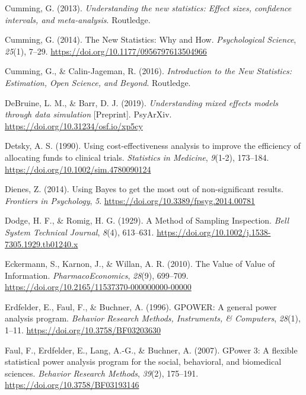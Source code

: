 \documentclass[
  english,
  ,jou, a4paper,floatsintext]{apa6}
\newlength{\cslhangindent}
\newenvironment{cslreferences}%
  {\setlength{\parindent}{0pt}%
  \everypar{\setlength{\hangindent}{\cslhangindent}}\ignorespaces}%
  {\par}
\begin{document}
\begin{cslreferences}
\leavevmode\hypertarget{ref-cumming_understanding_2013}{}%
Cumming, G. (2013). \emph{Understanding the new statistics: Effect sizes, confidence intervals, and meta-analysis}. Routledge.

\leavevmode\hypertarget{ref-cumming_new_2014}{}%
Cumming, G. (2014). The New Statistics: Why and How. \emph{Psychological Science}, \emph{25}(1), 7--29. \url{https://doi.org/10.1177/0956797613504966}

\leavevmode\hypertarget{ref-cumming_introduction_2016}{}%
Cumming, G., \& Calin-Jageman, R. (2016). \emph{Introduction to the New Statistics: Estimation, Open Science, and Beyond}. Routledge.

\leavevmode\hypertarget{ref-debruine_understanding_2019}{}%
DeBruine, L. M., \& Barr, D. J. (2019). \emph{Understanding mixed effects models through data simulation} {[}Preprint{]}. PsyArXiv. \url{https://doi.org/10.31234/osf.io/xp5cy}

\leavevmode\hypertarget{ref-detsky_using_1990}{}%
Detsky, A. S. (1990). Using cost-effectiveness analysis to improve the efficiency of allocating funds to clinical trials. \emph{Statistics in Medicine}, \emph{9}(1-2), 173--184. \url{https://doi.org/10.1002/sim.4780090124}

\leavevmode\hypertarget{ref-dienes_using_2014}{}%
Dienes, Z. (2014). Using Bayes to get the most out of non-significant results. \emph{Frontiers in Psychology}, \emph{5}. \url{https://doi.org/10.3389/fpsyg.2014.00781}

\leavevmode\hypertarget{ref-dodge_method_1929}{}%
Dodge, H. F., \& Romig, H. G. (1929). A Method of Sampling Inspection. \emph{Bell System Technical Journal}, \emph{8}(4), 613--631. \url{https://doi.org/10.1002/j.1538-7305.1929.tb01240.x}

\leavevmode\hypertarget{ref-eckermann_value_2010}{}%
Eckermann, S., Karnon, J., \& Willan, A. R. (2010). The Value of Value of Information. \emph{PharmacoEconomics}, \emph{28}(9), 699--709. \url{https://doi.org/10.2165/11537370-000000000-00000}

\leavevmode\hypertarget{ref-erdfelder_gpower_1996}{}%
Erdfelder, E., Faul, F., \& Buchner, A. (1996). GPOWER: A general power analysis program. \emph{Behavior Research Methods, Instruments, \& Computers}, \emph{28}(1), 1--11. \url{https://doi.org/10.3758/BF03203630}

\leavevmode\hypertarget{ref-faul_gpower_2007}{}%
Faul, F., Erdfelder, E., Lang, A.-G., \& Buchner, A. (2007). GPower 3: A flexible statistical power analysis program for the social, behavioral, and biomedical sciences. \emph{Behavior Research Methods}, \emph{39}(2), 175--191. \url{https://doi.org/10.3758/BF03193146}


\end{cslreferences}
\end{document}
